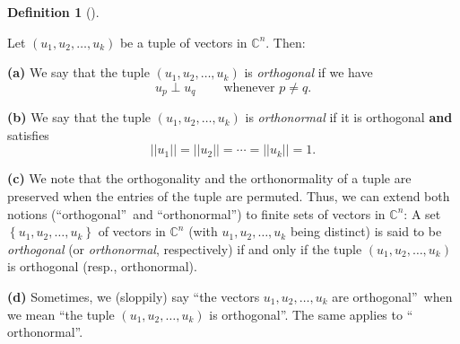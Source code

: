 \documentclass[numbers=enddot,12pt,final,onecolumn,notitlepage]{scrartcl}%
\numberwithin{exer}{subsection}
\theoremstyle{definition}
\newtheorem{defi}[theo]{Definition}
\newenvironment{definition}[1][]
{\begin{defi}[#1]\begin{leftbar}}
{\end{leftbar}\end{defi}}
\begin{document}
\begin{definition}
\label{def.unitary.innerprod.orth-n}Let $\left(  u_{1},u_{2},\ldots
,u_{k}\right)  $ be a tuple of vectors in $\mathbb{C}^{n}$. Then: \medskip

\textbf{(a)} We say that the tuple $\left(  u_{1},u_{2},\ldots,u_{k}\right)  $
is \emph{orthogonal} if we have
\[
u_{p}\perp u_{q}\ \ \ \ \ \ \ \ \ \ \text{whenever }p\neq q.
\]


\textbf{(b)} We say that the tuple $\left(  u_{1},u_{2},\ldots,u_{k}\right)  $
is \emph{orthonormal} if it is orthogonal \textbf{and} satisfies%
\[
\left\vert \left\vert u_{1}\right\vert \right\vert =\left\vert \left\vert
u_{2}\right\vert \right\vert =\cdots=\left\vert \left\vert u_{k}\right\vert
\right\vert =1.
\]


\textbf{(c)} We note that the orthogonality and the orthonormality of a tuple
are preserved when the entries of the tuple are permuted. Thus, we can extend
both notions (\textquotedblleft orthogonal\textquotedblright\ and
\textquotedblleft orthonormal\textquotedblright) to finite sets of vectors in
$\mathbb{C}^{n}$: A set $\left\{  u_{1},u_{2},\ldots,u_{k}\right\}  $ of
vectors in $\mathbb{C}^{n}$ (with $u_{1},u_{2},\ldots,u_{k}$ being distinct)
is said to be \emph{orthogonal} (or \emph{orthonormal}, respectively) if and
only if the tuple $\left(  u_{1},u_{2},\ldots,u_{k}\right)  $ is orthogonal
(resp., orthonormal). \medskip

\textbf{(d)} Sometimes, we (sloppily) say \textquotedblleft the vectors
$u_{1},u_{2},\ldots,u_{k}$ are orthogonal\textquotedblright\ when we mean
\textquotedblleft the tuple $\left(  u_{1},u_{2},\ldots,u_{k}\right)  $ is
orthogonal\textquotedblright. The same applies to \textquotedblleft
orthonormal\textquotedblright.
\end{definition}
\end{document}
